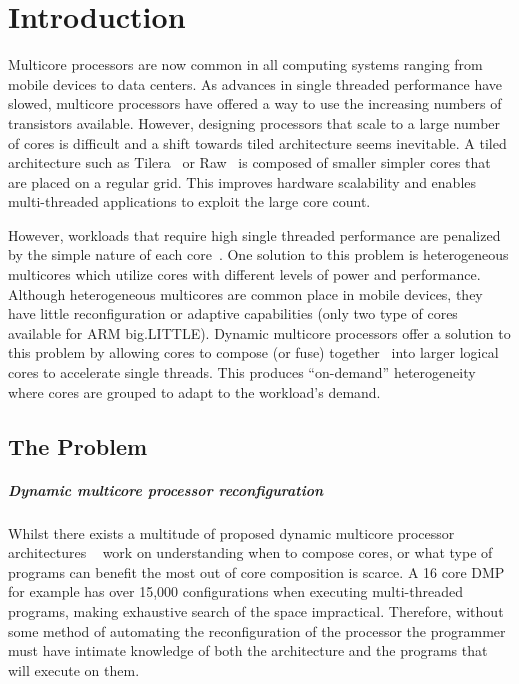 \chapter{Introduction}
Multicore processors are now common in all computing systems ranging from mobile devices to data centers.
As advances in single threaded performance have slowed, multicore processors have offered a way to use the increasing numbers of transistors available.
However, designing processors that scale to a large number of cores is difficult and a shift towards tiled architecture seems inevitable.
A tiled architecture such as Tilera~\cite{bell2008tile} or Raw~\cite{waingold1997raw} is composed of smaller simpler cores that are placed on a regular grid.
This improves hardware scalability and enables multi-threaded applications to exploit the large core count.

However, workloads that require high single threaded performance are penalized by the simple nature of each core~\cite{eyerman2010amdahl}.
One solution to this problem is heterogeneous multicores which utilize cores with different levels of power and performance.
Although heterogeneous multicores are common place in mobile devices, they have little reconfiguration or adaptive capabilities (\eg only two type of cores available for ARM big.LITTLE).
Dynamic multicore processors offer a solution to this problem by allowing cores to compose (or fuse) together~\cite{ipek2007CoreFusion} into larger logical cores to accelerate single threads.
This produces ``on-demand'' heterogeneity where cores are grouped to adapt to the workload's demand.

\section{The Problem}

\paragraph*{Dynamic multicore processor reconfiguration}
Whilst there exists a multitude of proposed dynamic multicore processor architectures ~\cite{MittalSurv2016} work on understanding when to compose cores, or what type of programs can benefit the most out of core composition is scarce.
A 16 core DMP for example has over 15,000 configurations when executing multi-threaded programs, making exhaustive search of the space impractical.
Therefore, without some method of automating the reconfiguration of the processor the programmer must have intimate knowledge of both the architecture and the programs that will execute on them.

